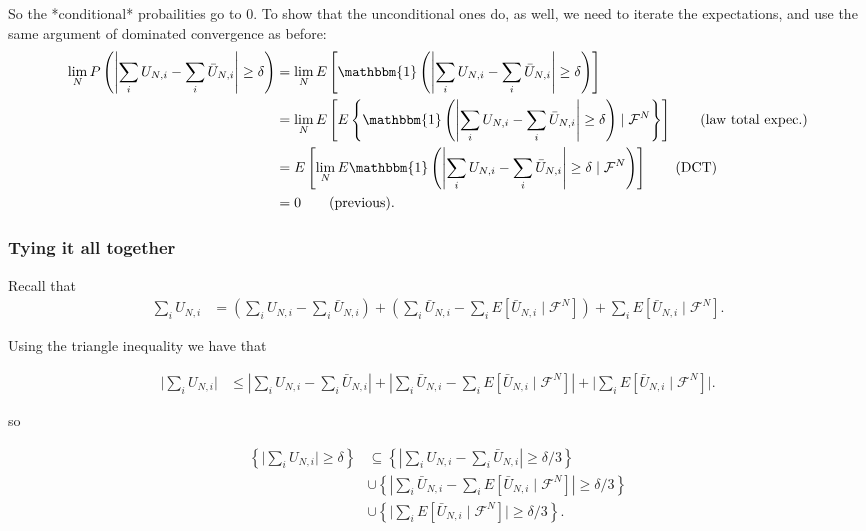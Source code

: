 \documentclass{article}
\begin{document}
So the *conditional* probailities go to $0$. To show that the unconditional ones do, as well, we need to iterate the expectations, and use the same argument of dominated convergence as before:
\begin{align*}
\lim_N P\left(\left| \sum_i U_{N,i} - \sum_i \bar{U}_{N,i} \right| \ge \delta  \right) 
&= \lim_N E\left[ \mathbbm{1}\left(\left| \sum_i U_{N,i} - \sum_i \bar{U}_{N,i} \right| \ge \delta  \right) \right] \\
&= \lim_N E\left[ E\left\{ \mathbbm{1} \left( \left| \sum_i U_{N,i} - \sum_i \bar{U}_{N,i} \right| \ge \delta \right)  \mid \mathcal{F}^N \right\}    \right] \tag{law total expec.} \\
&=  E\left[  \lim_N E \mathbbm{1}\left( \left| \sum_i U_{N,i} - \sum_i \bar{U}_{N,i} \right| \ge \delta  \mid \mathcal{F}^N  \right)  \right] \tag{DCT}\\
&= 0 \tag{previous}.
\end{align*}

\subsubsection*{Tying it all together}

Recall that
\begin{align*}
\sum_i U_{N,i} &= \left(\sum_i U_{N,i} - \sum_i \bar{U}_{N,i}\right) + \left(\sum_i \bar{U}_{N,i} - \sum_i E[ \bar{U}_{N,i}  \mid \mathcal{F}^N] \right) +  \sum_i E[ \bar{U}_{N,i}  \mid \mathcal{F}^N].
\end{align*}

Using the triangle inequality we have that

\begin{align*}
\bigg\rvert \sum_i U_{N,i} \bigg\rvert  &\le \left| \sum_i U_{N,i} - \sum_i \bar{U}_{N,i}\right| + \left|\sum_i \bar{U}_{N,i} - \sum_i E[ \bar{U}_{N,i}  \mid \mathcal{F}^N] \right| +  \bigg\rvert \sum_i E[ \bar{U}_{N,i}  \mid \mathcal{F}^N]\bigg\rvert .
\end{align*}

so

\begin{align*}
\left\{ \bigg\rvert \sum_i U_{N,i} \bigg\rvert  \ge \delta \right\}  &\subseteq \left\{ \left| \sum_i U_{N,i} - \sum_i \bar{U}_{N,i}\right| \ge \delta/3 \right\} \\
&\cup \left\{ \left|\sum_i \bar{U}_{N,i} - \sum_i E[ \bar{U}_{N,i}  \mid \mathcal{F}^N] \right| \ge \delta/3 \right\} \\
&\cup \left\{ \bigg\rvert \sum_i E[ \bar{U}_{N,i}  \mid \mathcal{F}^N]\bigg\rvert \ge \delta/3 \right\}.
\end{align*}
\end{document}

